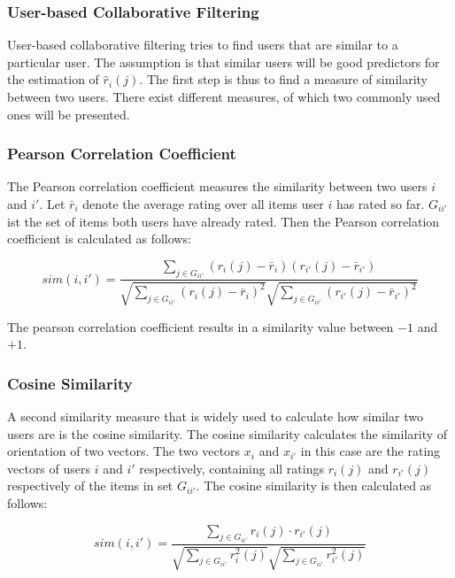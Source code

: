 \subsubsection{User-based Collaborative Filtering}
\label{ssst:userbasedcf} User-based collaborative filtering tries to find users that are similar to a particular user. The assumption is that similar users will be good predictors for the estimation of $\hat{r}_i(j)$. The first step is thus to find a measure of similarity between two users. There exist different measures, of which two commonly used ones will be presented.

\subsubsection{Pearson Correlation Coefficient}
\label{ssst:pearsoncorrelationcoefficient} The Pearson correlation coefficient measures the similarity between two users $i$ and $i'$. Let $\bar{r}_i$ denote the average rating over all items user $i$ has rated so far. $G_{ii'}$ ist the set of items both users have already rated. Then the Pearson correlation coefficient is calculated as follows:

\begin{equation}
sim(i,i') = \frac{\sum_{j \in G_{ii'}}{(r_i(j)-\bar{r}_i)(r_{i'}(j)-\bar{r}_{i'})}}{\sqrt{\sum_{j \in G_{ii'}}{(r_i(j)-\bar{r}_i)^2}}\sqrt{\sum_{j \in G_{ii'}}{(r_{i'}(j)-\bar{r}_{i'})^2}}}
\label{eq:pearson}
\end{equation}

The pearson correlation coefficient results in a similarity value between $-1$ and $+1$.

\subsubsection{Cosine Similarity}
\label{ssst:cosinesimilarity} A second similarity measure that is widely used to calculate how similar two users are is the cosine similarity. The cosine similarity calculates the similarity of orientation of two vectors. The two vectors $x_i$ and $x_{i'}$ in this case are the rating vectors of users $i$ and $i'$ respectively, containing all ratings $r_{i}(j)$ and $r_{i'}(j)$ respectively of the items in set $G_{ii'}$. The cosine similarity is then calculated as follows:

\begin{equation}
sim(i,i') = \frac{\sum_{j \in G_{ii'}}{r_{i}(j)\cdot r_{i'}(j)}}{\sqrt{\sum_{j \in G_{ii'}}{{r_{i}^2}(j)}}\sqrt{\sum_{j \in G_{ii'}}{{r_{i'}^2}(j)}}}
\label{eq:cosine}
\end{equation}

